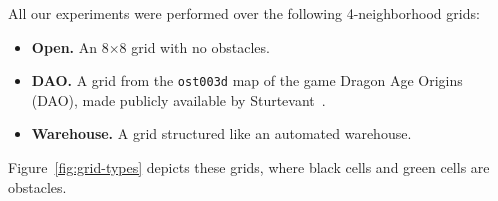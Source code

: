 \documentclass[jair,twoside,11pt,theapa]{article}
\begin{document}
All our experiments were performed over the following 4-neighborhood grids:
\begin{itemize}
    \item \textbf{Open.} An 8$\times$8 grid with no obstacles.
    \item \textbf{DAO.} A grid from the \texttt{ost003d} map of the game Dragon Age Origins (DAO), made publicly available by Sturtevant~.
     \item \textbf{Warehouse.} A grid structured like an automated warehouse. 
\end{itemize}
Figure~\ref{fig:grid-types} depicts these grids, where black cells and green cells are obstacles. 




\end{document}
